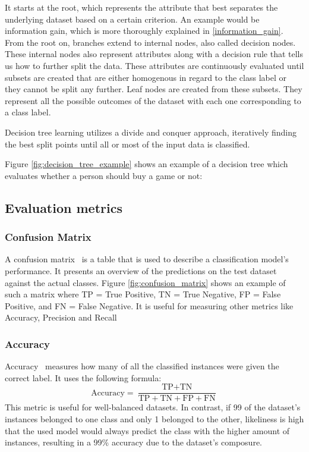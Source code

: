 It starts at the root, which represents the attribute that best separates the underlying dataset based on a certain criterion. An example would be information gain, which is more thoroughly explained in \ref{information_gain}. From the root on, branches extend to internal nodes, also called decision nodes. These internal nodes also represent attributes along with a decision rule that tells us how to further split the data. These attributes are continuously evaluated until subsets are created that are either homogenous in regard to the class label or they cannot be split any further. Leaf nodes are created from these subsets. They represent all the possible outcomes of the dataset with each one corresponding to a class label.

Decision tree learning utilizes a divide and conquer approach, iteratively finding the best split points until all or most of the input data is classified.

Figure \ref{fig:decision_tree_example} shows an example of a decision tree which evaluates whether a person should buy a game or not:

\subsection{Evaluation metrics}

\subsubsection{Confusion Matrix}
A confusion matrix~\cite{evaluation_metrics} is a table that is used to describe a classification model's performance. It presents an overview of the predictions on the test dataset against the actual classes. Figure \ref{fig:confusion_matrix} shows an example of such a matrix where TP = True Positive, TN = True Negative, FP = False Positive, and FN = False Negative.
It is useful for measuring other metrics like Accuracy, Precision and Recall

\subsubsection{Accuracy}
Accuracy~\cite{evaluation_metrics} measures how many of all the classified instances were given the correct label.
It uses the following formula:
\[ \text{Accuracy} = \frac{\text{TP} + \text{TN}}{\text{TP} + \text{TN} + \text{FP} + \text{FN}} \]
This metric is useful for well-balanced datasets. In contrast, if 99 of the dataset's instances belonged to one class and only 1 belonged to the other, likeliness is high that the used model would always predict the class with the higher amount of instances, resulting in a 99\% accuracy due to the dataset's composure.

